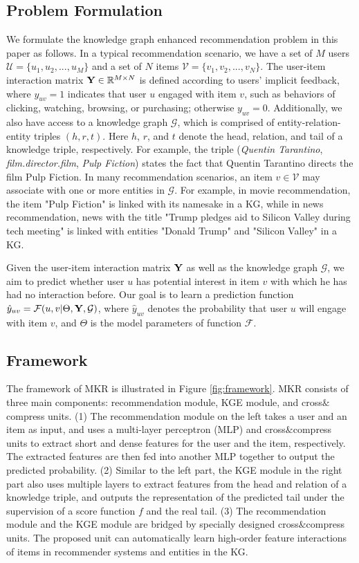 \documentclass[sigconf]{acmart}
\begin{document}
   \subsection{Problem Formulation}
		We formulate the knowledge graph enhanced recommendation problem in this paper as follows.
		In a typical recommendation scenario, we have a set of $M$ users $\mathcal U = \{u_1, u_2, ..., u_M\}$ and a set of $N$ items $\mathcal V = \{v_1, v_2, ..., v_N\}$.
		The user-item interaction matrix ${\bf Y} \in \mathbb R^{M \times N}$ is defined according to users' implicit feedback, where $y_{uv} = 1$ indicates that user $u$ engaged with item $v$, such as behaviors of clicking, watching, browsing, or purchasing; otherwise $y_{uv} = 0$.
		Additionally, we also have access to a knowledge graph $\mathcal G$, which is comprised of entity-relation-entity triples $(h, r, t)$.
		Here $h$, $r$, and $t$ denote the head, relation, and tail of a knowledge triple, respectively.
		For example, the triple (\textit{Quentin Tarantino}, \textit{film.director.film}, \textit{Pulp Fiction}) states the fact that Quentin Tarantino directs the film Pulp Fiction.
		In many recommendation scenarios, an item $v \in \mathcal V$ may associate with one or more entities in $\mathcal G$.
		For example, in movie recommendation, the item "Pulp Fiction" is linked with its namesake in a KG, while in news recommendation, news with the title "Trump pledges aid to Silicon Valley during tech meeting" is linked with entities "Donald Trump" and "Silicon Valley" in a KG.
		
		Given the user-item interaction matrix $\bf Y$ as well as the knowledge graph $\mathcal G$, we aim to predict whether user $u$ has potential interest in item $v$ with which he has had no interaction before.
		Our goal is to learn a prediction function ${\hat y}_{uv} = \mathcal F(u, v | \Theta, \bf Y, \mathcal G)$, where ${\hat y}_{uv}$ denotes the probability that user $u$ will engage with item $v$, and $\Theta$ is the model parameters of function $\mathcal F$.
	
	
	\subsection{Framework}		
		The framework of MKR is illustrated in Figure \ref{fig:framework}.
		MKR consists of three main components: recommendation module, KGE module, and cross$\&$compress units.
		(1) The recommendation module on the left takes a user and an item as input, and uses a multi-layer perceptron (MLP) and cross$\&$compress units to extract short and dense features for the user and the item, respectively.
		The extracted features are then fed into another MLP together to output the predicted probability.
		(2) Similar to the left part, the KGE module in the right part also uses multiple layers to extract features from the head and relation of a knowledge triple, and outputs the representation of the predicted tail under the supervision of a score function $f$ and the real tail.
		(3) The recommendation module and the KGE module are bridged by specially designed cross$\&$compress units.
		The proposed unit can automatically learn high-order feature interactions of items in recommender systems and entities in the KG.		
		
\end{document}
